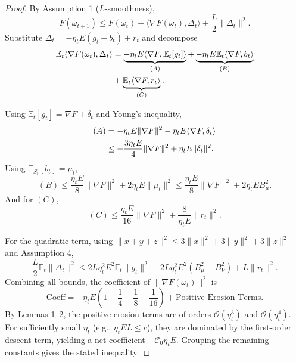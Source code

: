 \begin{proof}
By Assumption 1 ($L$-smoothness),
\begin{equation}
F(\omega_{t+1}) \le F(\omega_t) + \langle \nabla F(\omega_t), \Delta_t \rangle + \frac{L}{2}\|\Delta_t\|^2.
\end{equation}
Substitute $\Delta_t = -\eta_t E(g_t + b_t) + r_t$ and decompose
\begin{align}
\mathbb{E}_t\langle \nabla F(\omega_t), \Delta_t \rangle
&= \underbrace{-\eta_t E \langle \nabla F, \mathbb{E}_t[g_t] \rangle}_{(A)}
+ \underbrace{-\eta_t E \mathbb{E}_t \langle \nabla F, b_t \rangle}_{(B)} \notag \\
&+ \underbrace{\mathbb{E}_t \langle \nabla F, r_t \rangle}_{(C)}.
\end{align}

Using $\mathbb{E}_t[g_t] = \nabla F + \delta_t$ and Young's inequality,
\begin{align}
(A) &= -\eta_t E \|\nabla F\|^2 - \eta_t E \langle \nabla F, \delta_t \rangle \notag \\
&\le -\frac{3\eta_t E}{4}\|\nabla F\|^2 + \eta_t E \|\delta_t\|^2.
\end{align}
Using $\mathbb{E}_{S_t}[b_t] = \mu_t$,
\begin{equation}
(B) \le \frac{\eta_t E}{8} \|\nabla F\|^2 + 2\eta_t E \|\mu_t\|^2 \le \frac{\eta_t E}{8} \|\nabla F\|^2 + 2\eta_t E B_\mu^2.
\end{equation}
And for $(C)$,
\begin{equation}
(C) \le \frac{\eta_t E}{16} \|\nabla F\|^2 + \frac{8}{\eta_t E}\|r_t\|^2.
\end{equation}

For the quadratic term, using $\|x+y+z\|^2 \le 3\|x\|^2 + 3\|y\|^2 + 3\|z\|^2$ and Assumption 4,
\begin{equation}
\frac{L}{2} \mathbb{E}_t\|\Delta_t\|^2 \le 2L\eta_t^2 E^2 \mathbb{E}_t\|g_t\|^2 + 2L\eta_t^2 E^2 (B_\mu^2 + B_V^2) + L\|r_t\|^2.
\end{equation}
Combining all bounds, the coefficient of $\|\nabla F(\omega_t)\|^2$ is
\begin{equation}
\text{Coeff} = -\eta_t E \left( 1 - \frac{1}{4} - \frac{1}{8} - \frac{1}{16} \right) + \text{Positive Erosion Terms.}
\end{equation}
By Lemmas 1--2, the positive erosion terms are of orders $\mathcal{O}(\eta_t^3)$ and $\mathcal{O}(\eta_t^4)$. For sufficiently small $\eta_t$ (e.g., $\eta_tEL\le c$), they are dominated by the first-order descent term, yielding a net coefficient $-\mathcal{C}_0\eta_tE$. Grouping the remaining constants gives the stated inequality.
\end{proof}

